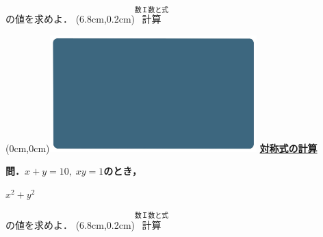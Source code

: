 \documentclass[10pt,
fleqn,
dvipdfmx,
uplatex
]{jsarticle}
\begin{document}
\Large
\hfill の値を求めよ．
\at(6.8cm,0.2cm){\small\color{bradorange}$\overset{\text{数Ｉ数と式}}{\text{計算}}$}


\newpage



\at(0cm,0cm){\includegraphics[width=8cm,bb=0 0 1920 1080]{./thumbnails/templates/smart_background/数I数と式.jpeg}}
{\color{orange}\bf\boldmath\huge\underline{対称式の計算}}\vspace{0.3zw}

\Large 
\bf\boldmath 問．$x+y={10},\;xy=1$のとき，

\HUGE
\hspace{2zw}$x^2+y^2$\vspace{0.3zw}

\Large
\hfill の値を求めよ．
\at(6.8cm,0.2cm){\small\color{bradorange}$\overset{\text{数Ｉ数と式}}{\text{計算}}$}
\end{document}
